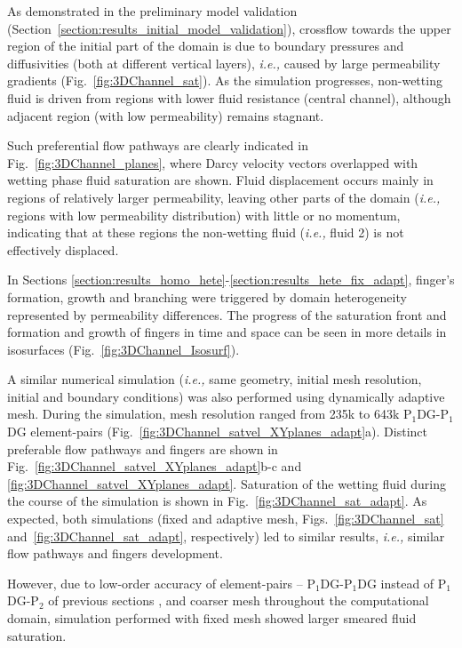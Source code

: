 \documentclass[preprint,authoryear,12pt]{elsarticle}
\newcommand{\PN}[2][error]{P$_{#1}$DG-P$_{#2}$}
\newcommand{\PNDG}[2][error]{P$_{#1}$DG-P$_{#2}$DG}
\newcommand{\ie}{{\it i.e., }}
\begin{document}
\medskip
As demonstrated in the preliminary model validation (Section~\ref{section:results_initial_model_validation}), crossflow towards the upper region of the initial part of the domain is due to boundary pressures and diffusivities (both at different vertical layers), \ie caused by large permeability gradients (Fig.~\ref{fig:3DChannel_sat}). As the simulation progresses, non-wetting fluid is driven from regions with lower fluid resistance (central channel), although adjacent region (with low permeability) remains stagnant.

\medskip
Such preferential flow pathways are clearly indicated in Fig.~\ref{fig:3DChannel_planes}, where Darcy velocity vectors overlapped with wetting phase fluid saturation are shown. Fluid displacement occurs mainly in regions of relatively larger permeability, leaving other parts of the domain (\ie regions with low permeability distribution) with little or no momentum, indicating that at these regions the non-wetting fluid (\ie fluid 2) is not effectively displaced. 

\medskip
In Sections \ref{section:results_homo_hete}-\ref{section:results_hete_fix_adapt}, finger's formation, growth and branching were triggered by domain heterogeneity represented by permeability differences. The progress of the saturation front and formation and growth of fingers in time and space can be seen in more details in isosurfaces (Fig.~\ref{fig:3DChannel_Isosurf}).

\medskip
A similar numerical simulation (\ie same geometry, initial mesh resolution, initial and boundary conditions) was also performed using dynamically adaptive mesh. During the simulation, mesh resolution ranged from 235k to 643k \PNDG[1]{1} element-pairs (Fig.~\ref{fig:3DChannel_satvel_XYplanes_adapt}a). Distinct preferable flow pathways and fingers are shown in Fig.~\ref{fig:3DChannel_satvel_XYplanes_adapt}b-c and \ref{fig:3DChannel_satvel_XYplanes_adapt}. Saturation of the wetting fluid during the course of the simulation is shown in Fig.~\ref{fig:3DChannel_sat_adapt}. As expected, both simulations (fixed and adaptive mesh, Figs.~\ref{fig:3DChannel_sat} and~\ref{fig:3DChannel_sat_adapt}, respectively) led to similar results, \ie similar flow pathways and fingers development. 

\medskip
However, due to low-order accuracy of element-pairs -- \PNDG[1]{1} instead of \PN[1]{2} of previous sections \citep[for full investigation on numerical accuracy associated with these element-pairs, see][]{salinas2015,salinas_2016,salinas_2018,adam_2016, gomes_2017}, and coarser mesh throughout the computational domain, simulation performed with fixed mesh showed larger smeared fluid saturation. 
\end{document}
